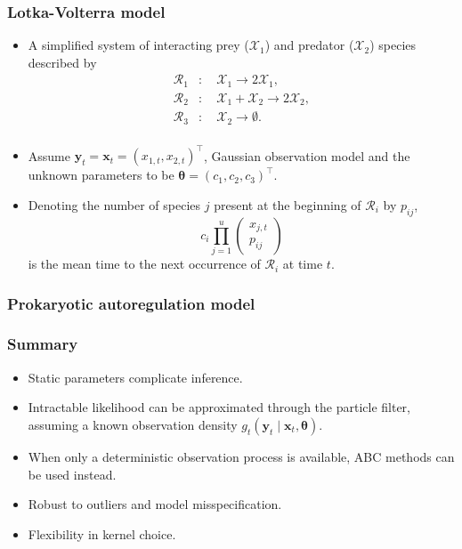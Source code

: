 \documentclass{beamer}
\newcommand{\bx}{\bm{x}}
\newcommand{\by}{\bm{y}}
\newcommand{\btheta}{\bm{\theta}}
\newcommand{\obs}{g}
\begin{document}
    \begin{frame}
    \frametitle{Lotka-Volterra model}
    \begin{itemize}
        \item A simplified system of interacting prey ($\mathcal{X}_1$) and predator ($\mathcal{X}_2$) species described by
        \begin{equation*}
        \begin{split}
        \mathcal{R}_1 &: \quad \mathcal{X}_1 \to 2 \mathcal{X}_1, \\
        \mathcal{R}_2 &: \quad \mathcal{X}_1 + \mathcal{X}_2 \to 2 \mathcal{X}_2, \\
        \mathcal{R}_3 &: \quad \mathcal{X}_2 \to \emptyset. \\
        \end{split}
        \end{equation*}
        \item Assume $\by_t = \bx_t = \left(x_{1,t}, x_{2,t}\right)^\intercal$, Gaussian observation model and the unknown parameters to be $\btheta = \left(c_1, c_2, c_3\right)^\intercal$.
        \item Denoting the number of species $j$ present at the beginning of $\mathcal{R}_i$ by $p_{ij}$,
        \begin{equation*}
            c_i \prod_{j=1}^{u} \begin{pmatrix}
            x_{j,t} \\
            p_{ij}
            \end{pmatrix}
        \end{equation*} is the mean time to the next occurrence of $\mathcal{R}_i$ at time $t$.
    \end{itemize}
    \end{frame}

    \begin{frame}
    \frametitle{Prokaryotic autoregulation model}
    \end{frame}

    \begin{frame}
    \frametitle{Summary}
    \begin{itemize}
        \item Static parameters complicate inference.
        \item Intractable likelihood can be approximated through the particle filter, assuming a known observation density $\obs_t(\by_t \mid \bx_t, \btheta)$.
        \item When only a deterministic observation process is available, ABC methods can be used instead.
        \item Robust to outliers and model misspecification.
        \item Flexibility in kernel choice.
    \end{itemize}
    \end{frame}
\end{document}
